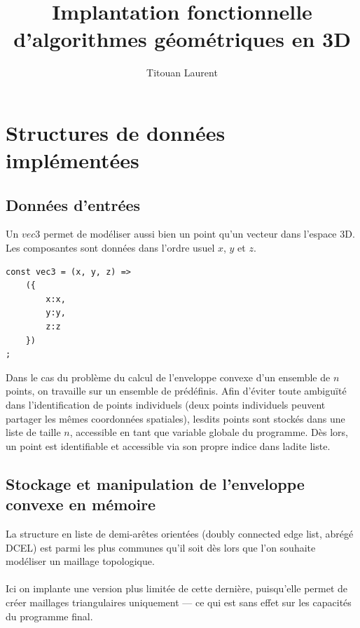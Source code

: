 \documentclass[]{article}
\title{Implantation fonctionnelle d'algorithmes géométriques en 3D}
\author{Titouan Laurent}
\date{}
\begin{document}
\maketitle

\section{Structures de données implémentées}

\subsection{Données d'entrées}
Un $vec3$ permet de modéliser aussi bien un point qu'un vecteur dans l'espace 3D. Les composantes sont données dans l'ordre usuel $x$, $y$ et $z$.
\begin{lstlisting}
const vec3 = (x, y, z) =>
	({
		x:x,
		y:y,
		z:z
	})
;
\end{lstlisting}
Dans le cas du problème du calcul de l'enveloppe convexe d'un ensemble de $n$ points, on travaille sur un ensemble de prédéfinis. Afin d'éviter toute ambiguïté dans l'identification de points individuels (deux points individuels peuvent partager les mêmes coordonnées spatiales), lesdits points sont stockés dans une liste de taille $n$, accessible en tant que variable globale du programme. Dès lors, un point est identifiable et accessible via son propre indice dans ladite liste.
\\

\subsection{Stockage et manipulation de l'enveloppe convexe en mémoire}
La structure en liste de demi-arêtes orientées (doubly connected edge list, abrégé DCEL) est parmi les plus communes qu'il soit dès lors que l'on souhaite modéliser un maillage topologique.\\\\
Ici on implante une version plus limitée de cette dernière, puisqu'elle permet de créer maillages triangulaires uniquement — ce qui est sans effet sur les capacités du programme final.
\end{document}
